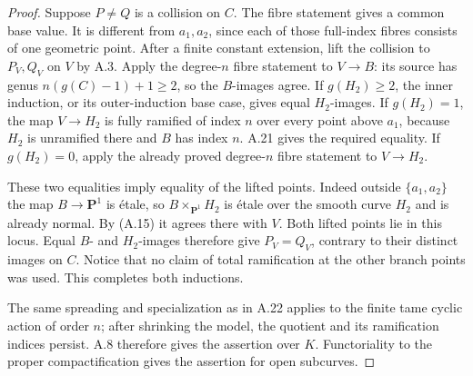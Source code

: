 \begin{proof}
Suppose $P\ne Q$ is a collision on $C$. The fibre
statement gives a common base value. It is different from
$a_1,a_2$, since each of those full-index fibres consists
of one geometric point. After a finite constant extension,
lift the collision to $P_V,Q_V$ on $V$ by A.3. Apply the
degree-$n$ fibre statement to $V\to B$: its source has
genus $n(g(C)-1)+1\ge2$, so the $B$-images agree. If
$g(H_2)\ge2$, the inner induction, or its outer-induction
base case, gives equal $H_2$-images. If $g(H_2)=1$, the
map $V\to H_2$ is fully ramified of index $n$ over every
point above $a_1$, because $H_2$ is unramified there and
$B$ has index $n$. A.21 gives the required equality.
If $g(H_2)=0$, apply the already proved degree-$n$ fibre
statement to $V\to H_2$.

These two equalities imply equality of the lifted points.
Indeed outside $\{a_1,a_2\}$ the map $B\to\mathbf P^1$
is \'etale, so $B\times_{\mathbf P^1}H_2$ is \'etale over
the smooth curve $H_2$ and is already normal. By (A.15)
it agrees there with $V$. Both lifted points lie in this
locus. Equal $B$- and $H_2$-images therefore give
$P_V=Q_V$, contrary to their distinct images on $C$.
Notice that no claim of total ramification at the other
branch points was used. This completes both inductions.

The same spreading and specialization as in A.22 applies
to the finite tame cyclic action of order $n$; after
shrinking the model, the quotient and its ramification
indices persist. A.8 therefore gives the assertion over
$K$. Functoriality to the proper compactification gives
the assertion for open subcurves.
\end{proof}

